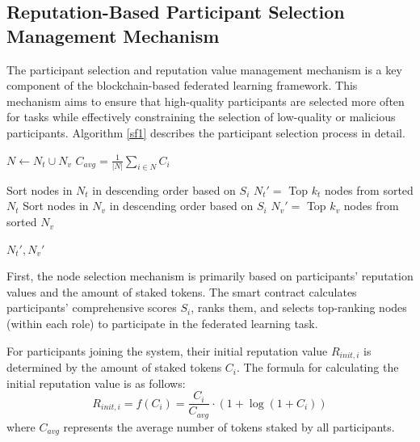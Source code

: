\documentclass[a4paper]{cas-dc}
\begin{document}
\subsection{Reputation-Based Participant Selection Management Mechanism}
The participant selection and reputation value management mechanism is a key component of the blockchain-based federated learning framework. This mechanism aims to ensure that high-quality participants are selected more often for tasks while effectively constraining the selection of low-quality or malicious participants. Algorithm \ref{sf1} describes the participant selection process in detail.
\begin{algorithm}
	\caption{Participant Selection and Reputation Management}
	\label{sf1}
	
	$N \leftarrow N_t \cup N_v$\;
	$C_{avg} = \frac{1}{|N|} \sum_{i \in N} C_i$\;
	
	Sort nodes in $N_t$ in descending order based on $S_i$\;
	$N_t' =$ Top $k_t$ nodes from sorted $N_t$\;
	Sort nodes in $N_v$ in descending order based on $S_i$\;
	$N_v' =$ Top $k_v$ nodes from sorted $N_v$\;
	
	\Return $N_t', N_v'$\;
\end{algorithm}

First, the node selection mechanism is primarily based on participants' reputation values and the amount of staked tokens. The smart contract calculates participants' comprehensive scores $S_i$, ranks them, and selects top-ranking nodes (within each role) to participate in the federated learning task.

For participants joining the system, their initial reputation value $R_{init,i}$ is determined by the amount of staked tokens $C_i$. The formula for calculating the initial reputation value is as follows:
\begin{equation}
	R_{init,i} = f(C_i) = \frac{C_i}{C_{avg}} \cdot \left(1 + \log(1 + C_i)\right)
\end{equation}
where $C_{avg}$ represents the average number of tokens staked by all participants.
\end{document}
